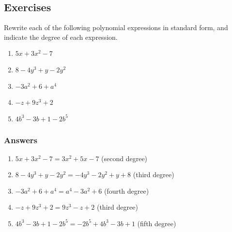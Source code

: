 \documentclass[12pt]{article}
\begin{document}
\newpage

\subsection*{Exercises}

Rewrite each of the following polynomial expressions in standard form, and indicate the degree of each expression.

\begin{enumerate}
    \item $5x + 3x^2 - 7$
    \item $8 - 4y^3 + y - 2y^2$
    \item $-3a^2 + 6 + a^4$
    \item $-z + 9z^3 + 2$
    \item $4b^3 - 3b + 1 - 2b^5$
\end{enumerate}

\subsubsection*{Answers}

\begin{enumerate}
\item $5x + 3x^2 - 7 = 3x^2 + 5x - 7$ (second degree)
\item $8 - 4y^3 + y - 2y^2 = -4y^3 - 2y^2 + y + 8$ (third degree)
\item $-3a^2 + 6 + a^4 = a^4 - 3a^2 + 6$ (fourth degree)
\item $-z + 9z^3 + 2 = 9z^3 - z + 2$ (third degree)
\item $4b^3 - 3b + 1 - 2b^5 = -2b^5 + 4b^3 - 3b + 1$ (fifth degree)
\end{enumerate}
\end{document}
